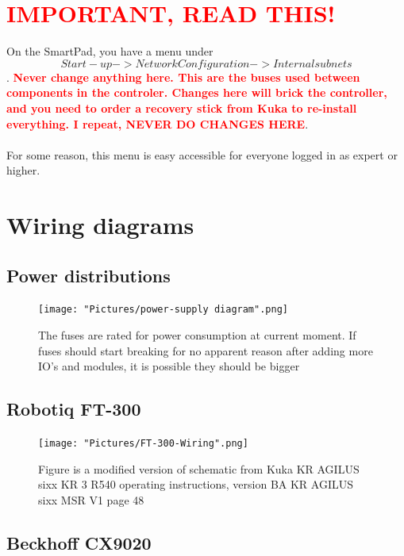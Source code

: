 \documentclass{article}
\begin{document}
\newpage

\section{\textbf{\textcolor{red}{IMPORTANT, READ THIS!}}}
On the SmartPad, you have a menu under $$Start-up->Network Configuration->Internal subnets$$. 
\textbf{\textcolor{red}{Never change anything here. This are the buses used between components in the controler. Changes here will brick the controller, and you need to order a recovery stick from Kuka to re-install everything. I repeat, NEVER DO CHANGES HERE}}. 
\\\\
For some reason, this menu is easy accessible for everyone logged in as expert or higher.

\newpage 

\section{Wiring diagrams}

    \subsection{Power distributions}
    
    \begin{figure}[!h]
        \centering
        \texttt{[image: "Pictures/power-supply diagram".png]}
        \caption{The fuses are rated for power consumption at current moment. If fuses should start breaking for no apparent reason after adding more IO's and modules, it is possible they should be bigger}
    \end{figure}
    
    \newpage
    
     \subsection{Robotiq FT-300}
    
    \begin{figure}[!h]
        \centering
        \texttt{[image: "Pictures/FT-300-Wiring".png]}
        \caption{Figure is a modified version of schematic from Kuka KR AGILUS sixx KR 3 R540 operating instructions, version BA KR AGILUS sixx MSR V1 page 48}
        \label{fig:my_label}
    \end{figure}
    
    \newpage
    
    \subsection{Beckhoff CX9020}
\end{document}
